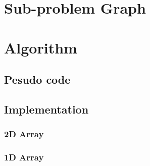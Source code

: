 \documentclass{beamer}
\begin{document}
\section{Sub-problem Graph}
\begin{frame}
	
\end{frame}

\section{Algorithm}
\begin{frame}
	
\end{frame}
\subsection{Pesudo code}
\begin{frame}
	
\end{frame}

\subsection{Implementation}
\begin{frame}
	\frametitle{2D Array}
  
\end{frame}

\begin{frame}
	\frametitle{1D Array}
  
\end{frame}
\end{document}
